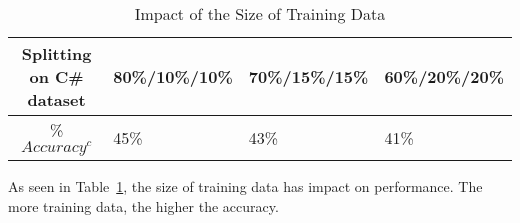 
\begin{table}[t]
\caption{Impact of the Size of Training Data}
	\vspace{-7pt}
	\tabcolsep 2pt
	\small
	\begin{center}
\begin{tabular}{|c|l|l|l|}
  \hline
  Splitting on C\# dataset & 80\%/10\%/10\% & 70\%/15\%/15\% & 60\%/20\%/20\% \\
  \hline
  \% $Accuracy^{c}$ & 45\% & 43\% & 41\% \\
  \hline
\end{tabular}
\label{splitting}
	\end{center}
\vspace{-3pt}
\end{table}

As seen in Table~\ref{splitting}, the size of training data has impact
on performance. The more training data, the higher the accuracy.

